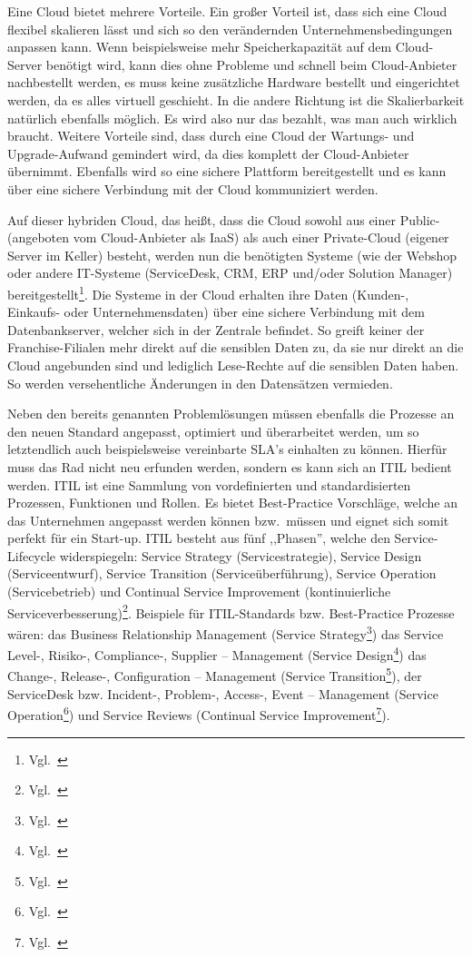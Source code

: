 Eine Cloud bietet mehrere Vorteile. Ein großer Vorteil ist, dass sich
eine Cloud flexibel skalieren lässt und sich so den verändernden
Unternehmensbedingungen anpassen kann. Wenn beispielsweise mehr
Speicherkapazität auf dem Cloud-Server benötigt wird, kann dies ohne
Probleme und schnell beim Cloud-Anbieter nachbestellt werden, es muss
keine zusätzliche Hardware bestellt und eingerichtet werden, da es
alles virtuell geschieht. In die andere Richtung ist die
Skalierbarkeit natürlich ebenfalls möglich. Es wird also nur das
bezahlt, was man auch wirklich braucht. Weitere Vorteile sind, dass
durch eine Cloud der Wartungs- und Upgrade-Aufwand gemindert wird, da
dies komplett der Cloud-Anbieter übernimmt. Ebenfalls wird so eine
sichere Plattform bereitgestellt und es kann über eine sichere
Verbindung mit der Cloud kommuniziert werden.

Auf dieser hybriden Cloud, das heißt, dass die Cloud sowohl aus einer
Public- (angeboten vom Cloud-Anbieter als IaaS) als auch einer
Private-Cloud (eigener Server im Keller) besteht, werden nun die
benötigten Systeme (wie der Webshop oder andere IT-Systeme
(ServiceDesk, CRM, ERP und/oder Solution Manager)
bereitgestellt\footnote{Vgl.~\cite{Hybrid-Cloud}}. Die Systeme in der
Cloud erhalten ihre Daten (Kunden-, Einkaufs- oder Unternehmensdaten)
über eine sichere Verbindung mit dem Datenbankserver, welcher sich in
der Zentrale befindet. So greift keiner der Franchise-Filialen mehr
direkt auf die sensiblen Daten zu, da sie nur direkt an die Cloud
angebunden sind und lediglich Lese-Rechte auf die sensiblen Daten
haben. So werden versehentliche Änderungen in den Datensätzen
vermieden.

Neben den bereits genannten Problemlösungen müssen ebenfalls die
Prozesse an den neuen Standard angepasst, optimiert und überarbeitet
werden, um so letztendlich auch beispielsweise vereinbarte SLA’s
einhalten zu können. Hierfür muss das Rad nicht neu erfunden werden,
sondern es kann sich an ITIL bedient werden. ITIL ist eine Sammlung
von vordefinierten und standardisierten Prozessen, Funktionen und
Rollen. Es bietet Best-Practice Vorschläge, welche an das Unternehmen
angepasst werden können bzw.~müssen und eignet sich somit perfekt für
ein Start-up. ITIL besteht aus fünf ,,Phasen'', welche den
Service-Lifecycle widerspiegeln: Service Strategy (Servicestrategie),
Service Design (Serviceentwurf), Service Transition
(Serviceüberführung), Service Operation (Servicebetrieb) und Continual
Service Improvement (kontinuierliche
Serviceverbesserung)\footnote{Vgl.~\cite{ITIL-Prozesse}}. Beispiele
für ITIL-Standards bzw. Best-Practice Prozesse wären: das Business
Relationship Management (Service
Strategy\footnote{Vgl.~\cite{ITIL-Service-Strategy}}) das Service
Level-, Risiko-, Compliance-, Supplier – Management (Service
Design\footnote{Vgl.~\cite{ITIL-Service-Design}}) das Change-,
Release-, Configuration – Management (Service
Transition\footnote{Vgl.~\cite{ITIL-Service-Transition}}), der
ServiceDesk bzw. Incident-, Problem-, Access-, Event – Management
(Service Operation\footnote{Vgl.~\cite{ITIL-Service-Operation}}) und
Service Reviews (Continual Service
Improvement\footnote{Vgl.~\cite{ITIL-CSI}}).

